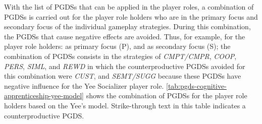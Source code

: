 With the list of PGDSs that can be applied in the player roles, a combination of PGDSs is carried out for the player role holders who are in the primary focus and secondary focus of the individual gameplay strategies.
During this combination, the PGDSs that cause negative effects are avoided.
Thus, for example, for the player role holders:  as primary focus (P), and  as secondary focus (S); the combination of PGDSs consists in the strategies of \emph{CMPT/CMPR}, \emph{COOP}, \emph{PERS}, \emph{SIML}, and \emph{REWD} in which the counterproductive PGDSs avoided for this combination were \emph{CUST}, and \emph{SEMT/SUGG} because these PGDSs have negative influence for the Yee Socializer player role.
\autoref{tab:pgds-cognitive-apprenticeship-yee-model} shows the combination of PGDSs for the player role holders based on the Yee's model.
Strike-through text in this table indicates a counterproductive PGDS. 


